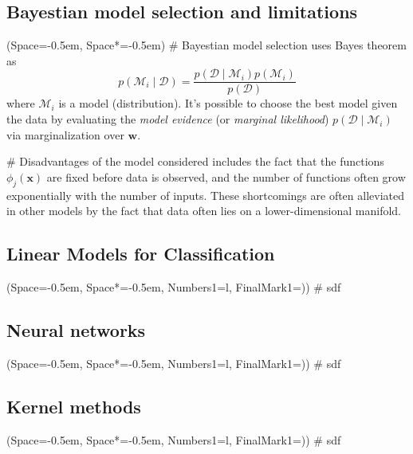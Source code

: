 \documentclass[12pt, a4paper]{article}
\newcommand{\listSpace}{-0.5em}%
\newcommand{\D}{\mathcal{D}}
\newcommand{\vect}[1]{\bm{#1}}
\begin{document}
\subsection*{Bayestian model selection and limitations}
\begin{easylist}[itemize]
	\ListProperties(Space=\listSpace, Space*=\listSpace)
	# Bayestian model selection uses Bayes theorem as
	\begin{equation*}
		p( \mathcal{M}_i \mid \D) = \frac{p( \D \mid \mathcal{M}_i) p( \mathcal{M}_i )}{p( \D)}
	\end{equation*}
	where $\mathcal{M}_i$ is a model (distribution).
	It's possible to choose the best model given the data by evaluating the \emph{model evidence} (or \emph{marginal likelihood}) $p( \D \mid \mathcal{M}_i)$ via marginalization over $\vect{w}$.
	
	# Disadvantages of the model considered includes the fact that the functions $\phi_j(\vect{x})$ are fixed before data is observed, and the number of functions often grow exponentially with the number of inputs.
	These shortcomings are often alleviated in other models by the fact that data often lies on a lower-dimensional manifold.
\end{easylist}

\subsection{Linear Models for Classification}
\begin{easylist}[itemize]
	\ListProperties(Space=\listSpace, Space*=\listSpace, Numbers1=l, FinalMark1={)})
	# sdf
\end{easylist}

\subsection{Neural networks}
\begin{easylist}[itemize]
	\ListProperties(Space=\listSpace, Space*=\listSpace, Numbers1=l, FinalMark1={)})
	# sdf
\end{easylist}

\subsection{Kernel methods}
\begin{easylist}[itemize]
	\ListProperties(Space=\listSpace, Space*=\listSpace, Numbers1=l, FinalMark1={)})
	# sdf
\end{easylist}
\end{document}
